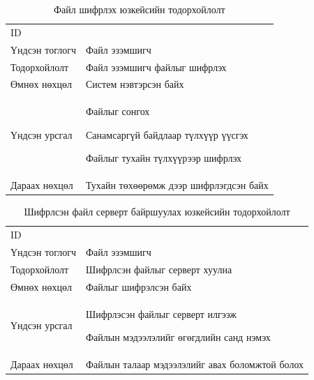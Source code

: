 \begin{table}
    \label{tab:treatments}
    \footnotesize
    \centering
    \begin{tabularx}{\textwidth}{|>{\hsize=0.3\hsize}X|>{\hsize=0.7\hsize}X|}
        \hline
        \multicolumn{2}{|c|}{Файл шифрлэх} \\
        \hline
        ID & 3 \\
        \hline
        Үндсэн тоглогч & Файл эзэмшигч\\
        \hline
        Тодорхойлолт & Файл эзэмшигч файлыг шифрлэх\\
        \hline
        Өмнөх нөхцөл & Систем нэвтэрсэн байх\\
        \hline
        Үндсэн урсгал &
            \item Файлыг сонгох
            \item Санамсаргүй байдлаар түлхүүр үүсгэх
            \item Файлыг тухайн түлхүүрээр шифрлэх
        \\
        \hline
        Дараах нөхцөл & Тухайн төхөөрөмж дээр шифрлэгдсэн байх\\
        \hline
    \end{tabularx}
    \caption{Файл шифрлэх юзкейсийн тодорхойлолт}
\end{table}

\begin{table}
    \label{tab:treatments}
    \footnotesize
    \centering
    \begin{tabularx}{\textwidth}{|>{\hsize=0.3\hsize}X|>{\hsize=0.7\hsize}X|}
        \hline
        \multicolumn{2}{|c|}{Шифрлсэн файл серверт байршуулах} \\
        \hline
        ID & 4 \\
        \hline
        Үндсэн тоглогч & Файл эзэмшигч\\
        \hline
        Тодорхойлолт & Шифрлсэн файлыг серверт хуулна\\
        \hline
        Өмнөх нөхцөл & Файлыг шифрэлсэн байх\\
        \hline
        Үндсэн урсгал &
            \item Шифрлэсэн файлыг серверт илгээж
            \item Файлын мэдээлэлийг өгөгдлийн санд нэмэх 
        \\
        \hline
        Дараах нөхцөл & Файлын талаар мэдээлэлийг авах боломжтой болох\\
        \hline
    \end{tabularx}
    \caption{Шифрлсэн файл серверт байршуулах юзкейсийн тодорхойлолт}
\end{table}

